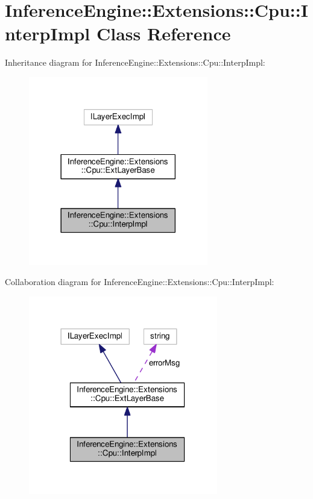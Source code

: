\hypertarget{classInferenceEngine_1_1Extensions_1_1Cpu_1_1InterpImpl}{}\section{Inference\+Engine\+:\+:Extensions\+:\+:Cpu\+:\+:Interp\+Impl Class Reference}
\label{classInferenceEngine_1_1Extensions_1_1Cpu_1_1InterpImpl}


Inheritance diagram for Inference\+Engine\+:\+:Extensions\+:\+:Cpu\+:\+:Interp\+Impl\+:
\nopagebreak
\begin{figure}[H]
\begin{center}
\leavevmode
\includegraphics[width=222pt]{classInferenceEngine_1_1Extensions_1_1Cpu_1_1InterpImpl__inherit__graph}
\end{center}
\end{figure}


Collaboration diagram for Inference\+Engine\+:\+:Extensions\+:\+:Cpu\+:\+:Interp\+Impl\+:
\nopagebreak
\begin{figure}[H]
\begin{center}
\leavevmode
\includegraphics[width=234pt]{classInferenceEngine_1_1Extensions_1_1Cpu_1_1InterpImpl__coll__graph}
\end{center}
\end{figure}
